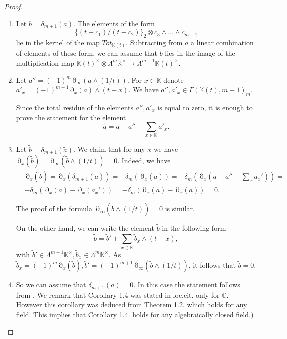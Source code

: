 \documentclass[12pt]{extarticle}
\def\mb{\mathbb}
\def\L{\Lambda}
\def\k{\mb K}
\def\C{\mb C}
\def\t{\times}
\def\wt{\widetilde}
\DeclareMathOperator{\ts}{\partial}
\begin{document}
\begin{proof}
\begin{enumerate}
    \item Let $b=\delta_{m+1}(a)$. The elements of the form $$\{(t-c_1)/(t-c_2)\}_2\otimes c_3\wedge\dots\wedge c_{m+1}$$ lie in the kernel of the map $Tot_{\k(t)}$. Subtracting from $a$ a linear combination of  elements of these form, we can assume that $b$ lies in the image of the multiplication map $\k(t)^\t\otimes \L^{m}\k^\t\to\L^{m+1}\k(t)^\t$.
    
    \item Let $a''=(-1)^m\ts_{\infty}(a\wedge (1/t))$. For $x\in\k$ denote $a'_x= (-1)^{m+1}\ts_{x}(a)\wedge (t-x)$. We have $a'',a'_x\in \Gamma(\k(t),m+1)_m$. 
    
    Since the total residue of the elements $a'',a'_x$ is equal to zero, it is enough to prove the statement for the element $$\wt a=a-a''-\sum\limits_{x\in \k}a'_x.$$
    \item Let $\wt b=\delta_{m+1}(\wt a)$.  We claim that for any $x$ we have $\ts_{x}(\wt b)=\ts_{\infty}(\wt b\wedge (1/t))=0$. Indeed, we have 
    \begin{align*}
        &\ts_x(\wt b)=\ts_x(\delta_{m+1}(\wt a))=-\delta_{m}(\ts_x(\wt a))=-\delta_{m}(\ts_x(a-a''-\sum_x a_x'))=\\&-\delta_{m}(\ts_x (a)-\ts_x(a_x'))=-\delta_{m}(\ts_x(a)-\ts_x(a))=0.
    \end{align*}


    The proof of the formula $\ts_{\infty}(\wt b\wedge (1/t))=0$ is similar.
    
    On the other hand, we can write the element $\wt b$ in the following form
    $$ \wt b= \wt b'+\sum\limits_{x\in\k}\wt b_x\wedge (t-x),$$
    with $\wt b'\in \L^{m+1}\k^\times, \wt b_x\in \L^m\k^\times$.
    As $\wt b_x=(-1)^m\ts_x(\wt b), \wt b'=(-1)^{m+1}\ts_{\infty}(\wt b\wedge (1/t))$, it follows that $\wt b=0$.

    \item So we can assume that $\delta_{m+1}(a)=0$. In this case the statement follows from \cite[Corollary 1.4]{rudenko2021strong}. We remark that Corollary 1.4 was stated in loc.cit. only for $\C$. However this corollary was deduced from Theorem 1.2. which holds for any field. This implies that Corollary 1.4. holds for any algebraically closed field.)
\end{enumerate}
\end{proof}
\end{document}
